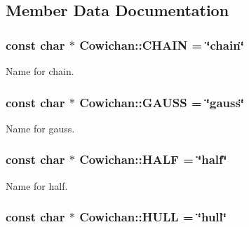 \subsection{Member Data Documentation}
\hypertarget{class_cowichan_17937f5dfe24c46c00a76d48ca70ccaa}{
\subsubsection[{CHAIN}]{\setlength{\rightskip}{0pt plus 5cm}const char $\ast$ {\bf Cowichan::CHAIN} = \char`\"{}chain\char`\"{}}}
\label{class_cowichan_17937f5dfe24c46c00a76d48ca70ccaa}


Name for chain. \hypertarget{class_cowichan_b51b18cab3bd7cab0f3eb5c10f4cce0a}{
\subsubsection[{GAUSS}]{\setlength{\rightskip}{0pt plus 5cm}const char $\ast$ {\bf Cowichan::GAUSS} = \char`\"{}gauss\char`\"{}}}
\label{class_cowichan_b51b18cab3bd7cab0f3eb5c10f4cce0a}


Name for gauss. \hypertarget{class_cowichan_6ef0b7dddca7331c9bfb2acd0ea60088}{
\subsubsection[{HALF}]{\setlength{\rightskip}{0pt plus 5cm}const char $\ast$ {\bf Cowichan::HALF} = \char`\"{}half\char`\"{}}}
\label{class_cowichan_6ef0b7dddca7331c9bfb2acd0ea60088}


Name for half. \hypertarget{class_cowichan_c0ca862afefd5d6ab8fefdbf47428b21}{
\subsubsection[{HULL}]{\setlength{\rightskip}{0pt plus 5cm}const char $\ast$ {\bf Cowichan::HULL} = \char`\"{}hull\char`\"{}}}
\label{class_cowichan_c0ca862afefd5d6ab8fefdbf47428b21}


